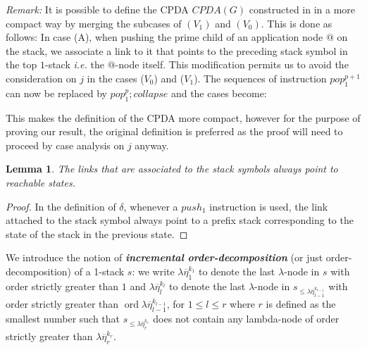 \documentclass{article}
\newcommand{\ord}{\mathop{\mathrm{ord}}}
\newcommand{\prefixof}{\leqslant}
\newcommand\defname[1]{{\bf\em #1}\index{#1}}
\newtheorem{lemma}{Lemma}[section]
\theoremstyle{remark}
\theoremstyle{definition}
\begin{document}
{\it Remark:} It is possible to define the 
CPDA $CPDA(G)$ constructed in \cite{hague-sto07} in a more compact way by 
merging the subcases of $(V_1)$ and $(V_0)$. This is done as follows: In case (A), when pushing the prime child of an application node $@$ on the stack, we associate a link to it that points to the preceding stack symbol in the top $1$-stack {\it i.e.} the $@$-node itself.
 This modification permits us to avoid the consideration on $j$ in the
 cases ($V_0$) and ($V_1$). The sequences of instruction $pop_1^{p+1}$ can now be replaced by
 $pop_1^p ; collapse$ and the cases become:
 \bigskip
\begin{center}
\end{center}
This makes the definition of the CPDA more compact, however for the purpose of proving our result, the original definition is preferred as the proof will need to proceed by case analysis on $j$ anyway.


\begin{lemma}
  \label{lem:links_pointto_reachable}
 The links that are associated to the stack symbols always point to reachable states.
\end{lemma}
\begin{proof}
  In the definition of $\delta$, whenever a $push_1$ instruction is used, the link attached to the stack symbol always point to a prefix stack corresponding to the state of the stack in the previous state.
\end{proof}


We introduce the notion of \defname{incremental order-decomposition}
(or just order-decomposition) of a 1-stack $s$: we write $\lambda \overline{\eta}_1^{k_1}$ to denote the last $\lambda$-node in $s$ with order strictly greater than $1$ and
$\lambda \overline{\eta}_l^{k_l}$ to denote the last $\lambda$-node in $s_{\prefixof \lambda \overline{\eta}_{l-1}^{k_{l-1}}}$ with order strictly greater than $\ord{\lambda \overline{\eta}_{l-1}^{k_{l-1}}}$, for $1 \leq l \leq r$ where $r$ is defined as the smallest number such that $s_{\prefixof \lambda \overline{\eta}_{r}^{k_{r}}}$ does not contain any lambda-node of order strictly greater than $\lambda \overline{\eta}_{r}^{k_{r}}$.
\end{document}
